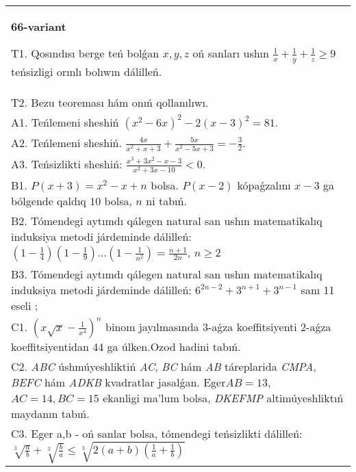 \documentclass{article}
\begin{document}
\begin{tabular}{m{17cm}}
\textbf{66-variant}
\newline

T1. Qosındısı berge teń bolǵan \(x,y,z\) oń sanları ushın \(\frac{1}{x} + \frac{1}{y} + \frac{1}{z} \geq 9\) teńsizligi orınlı bolıwın dálilleń. \\
T2. Bezu teoreması hám onıń qollanılıwı. \\
A1. Teńlemeni sheshiń \(\left( x^{2} - 6x \right)^{2} - 2(x - 3)^{2} = 81\). \\
A2. Teńlemeni sheshiń. \(\frac{4x}{x^{2} + x + 3} + \frac{5x}{x^{2} - 5x + 3} = - \frac{3}{2}\). \\
A3. Teńsizlikti sheshiń: \(\frac{x^{3} + 3x^{2} - x - 3}{x^{2} + 3x - 10} < 0\). \\
B1. \(P(x + 3) = x^{2} - x + n\) bolsa. \(P(x - 2)\) kópaǵzalını \(x - 3\) ga bólgende qaldıq \(10\) bolsa, \(n\) ni tabıń. \\
B2. Tómendegi aytımdı qálegen natural san ushın matematikalıq induksiya metodi járdeminde dálilleń: \(\left( 1 - \frac{1}{4} \right)\left( 1 - \frac{1}{9} \right)...\left( 1 - \frac{1}{n^{2}} \right) = \frac{n + 1}{2n}\), \(n \geq 2\) \\
B3. Tómendegi aytımdı qálegen natural san ushın matematikalıq induksiya metodi járdeminde dálilleń: \(6^{2n - 2} + 3^{n + 1} + 3^{n - 1}\) sanı 11 eseli ; \\
C1. \(\left( x\sqrt{x} - \frac{1}{x^{4}} \right)^{n}\) binom jayılmasında 3-aǵza koeffitsiyenti 2-aǵza koeffitsiyentidan 44 ga úlken.Ozod hadini tabıń. \\
C2. \emph{ABC} úshmúyeshliktiń \emph{AC}, \emph{BC} hám \emph{AB} táreplarida \emph{CMPA}, \emph{BEFC} hám \emph{ADKB} kvadratlar jasalǵan. Eger\(AB = 13\), \(AC = 14,BC = 15\) ekanligi ma'lum bolsa, \emph{DKEFMP} altimúyeshliktıń maydanın tabıń. \\
C3. Eger a,b - oń sanlar bolsa, tómendegi teńsizlikti dálilleń: \(\sqrt[3]{\frac{a}{b}} + \sqrt[3]{\frac{b}{a}} \leq \sqrt[3]{2(a + b)\left( \frac{1}{a} + \frac{1}{b} \right)}\) \\

\end{tabular}
\vspace{1cm}
\end{document}
